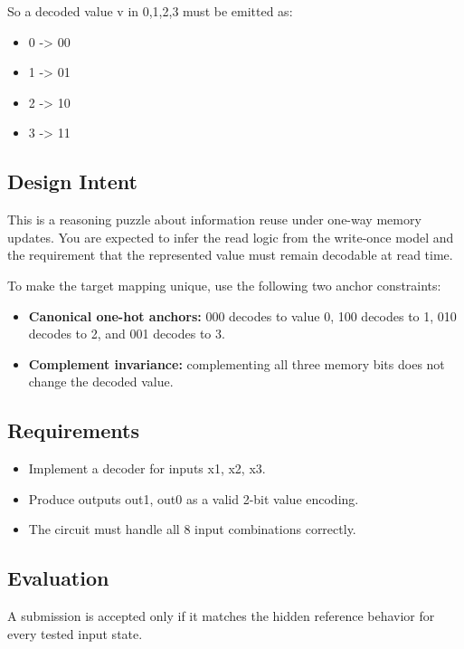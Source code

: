 So a decoded value v in {0,1,2,3} must be emitted as:
\begin{itemize}
  \item 0 -> 00
  \item 1 -> 01
  \item 2 -> 10
  \item 3 -> 11
\end{itemize}

\subsection*{Design Intent}
This is a reasoning puzzle about information reuse under one-way memory updates. You are expected to infer the read logic from the write-once model and the requirement that the represented value must remain decodable at read time.

To make the target mapping unique, use the following two anchor constraints:
\begin{itemize}
  \item \textbf{Canonical one-hot anchors:} 000 decodes to value 0, 100 decodes to 1, 010 decodes to 2, and 001 decodes to 3.
  \item \textbf{Complement invariance:} complementing all three memory bits does not change the decoded value.
\end{itemize}

\subsection*{Requirements}
\begin{itemize}
  \item Implement a decoder for inputs x1, x2, x3.
  \item Produce outputs out1, out0 as a valid 2-bit value encoding.
  \item The circuit must handle all 8 input combinations correctly.
\end{itemize}

\subsection*{Evaluation}
A submission is accepted only if it matches the hidden reference behavior for every tested input state.
